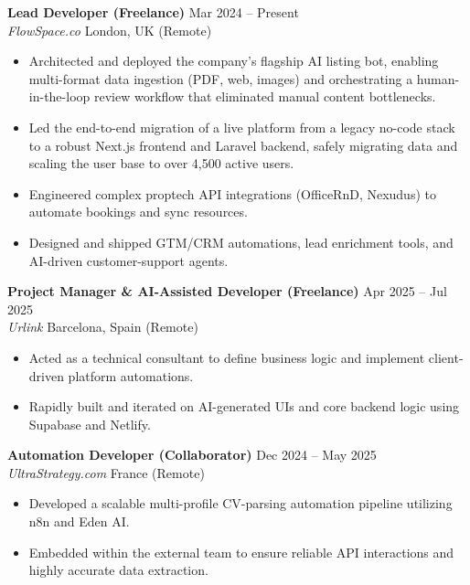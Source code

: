 \documentclass[10pt,a4paper]{article}
\begin{document}
\noindent\textbf{Lead Developer (Freelance)} \hfill Mar 2024 -- Present \\
\textit{FlowSpace.co} \hfill London, UK (Remote)
\begin{itemize}[leftmargin=0.2in, itemsep=0pt]
    \item Architected and deployed the company's flagship AI listing bot, enabling multi-format data ingestion (PDF, web, images) and orchestrating a human-in-the-loop review workflow that eliminated manual content bottlenecks.
    \item Led the end-to-end migration of a live platform from a legacy no-code stack to a robust Next.js frontend and Laravel backend, safely migrating data and scaling the user base to over 4,500 active users.
    \item Engineered complex proptech API integrations (OfficeRnD, Nexudus) to automate bookings and sync resources.
    \item Designed and shipped GTM/CRM automations, lead enrichment tools, and AI-driven customer-support agents.
\end{itemize}

\vspace{0.5em}
\noindent\textbf{Project Manager \& AI-Assisted Developer (Freelance)} \hfill Apr 2025 -- Jul 2025 \\
\textit{Urlink} \hfill Barcelona, Spain (Remote)
\begin{itemize}[leftmargin=0.2in, itemsep=0pt]
    \item Acted as a technical consultant to define business logic and implement client-driven platform automations.
    \item Rapidly built and iterated on AI-generated UIs and core backend logic using Supabase and Netlify.
\end{itemize}

\vspace{0.5em}
\noindent\textbf{Automation Developer (Collaborator)} \hfill Dec 2024 -- May 2025 \\
\textit{UltraStrategy.com} \hfill France (Remote)
\begin{itemize}[leftmargin=0.2in, itemsep=0pt]
    \item Developed a scalable multi-profile CV-parsing automation pipeline utilizing n8n and Eden AI.
    \item Embedded within the external team to ensure reliable API interactions and highly accurate data extraction.
\end{itemize}
\end{document}

